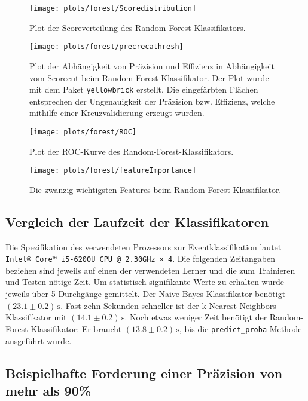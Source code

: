 \begin{figure}
	\centering
	\texttt{[image: plots/forest/Scoredistribution]}
	\caption{Plot der Scoreverteilung des Random-Forest-Klassifikators.}
	\label{fig:RF_SD}
\end{figure}

\begin{figure}
	\centering
	\texttt{[image: plots/forest/precrecathresh]}
	\caption{Plot der Abhängigkeit von Präzision und Effizienz in Abhängigkeit vom Scorecut beim Random-Forest-Klassifikator. Der Plot wurde mit dem Paket \texttt{yellowbrick} \cite{yellowbrick} erstellt. Die eingefärbten Flächen entsprechen der Ungenauigkeit der Präzision bzw. Effizienz, welche mithilfe einer Kreuzvalidierung erzeugt wurden.}
	\label{fig:RF_PRT}
\end{figure}

\begin{figure}
	\centering
	\texttt{[image: plots/forest/ROC]}
	\caption{Plot der ROC-Kurve des Random-Forest-Klassifikators.}
	\label{fig:RF_ROC}
\end{figure}


\begin{figure}
	\centering
	\texttt{[image: plots/forest/featureImportance]}
	\caption{Die zwanzig wichtigsten Features beim Random-Forest-Klassifikator.}
	\label{fig:RF_FI}
\end{figure}


\subsection{Vergleich der Laufzeit der Klassifikatoren}

Die Spezifikation des verwendeten Prozessors zur Eventklassifikation lautet \texttt{Intel® Core™ i5-6200U CPU @ 2.30GHz × 4}. Die folgenden Zeitangaben beziehen sind jeweils auf einen der verwendeten Lerner und die zum Trainieren und Testen nötige Zeit. Um statistisch signifikante Werte zu erhalten wurde jeweils über 5 Durchgänge gemittelt. Der Naive-Bayes-Klassifikator benötigt $(23.1 \pm 0.2) \,\text{s}$. Fast zehn Sekunden schneller ist der k-Nearest-Neighbors-Klassifikator mit $(14.1 \pm 0.2) \,\text{s}$. Noch etwas weniger Zeit benötigt der Random-Forest-Klassifikator: Er braucht $(13.8 \pm 0.2) \,\text{s}$, bis die \texttt{predict\_proba} Methode ausgeführt wurde.\textsl{}

\subsection{Beispielhafte Forderung einer Präzision von mehr als 90\%}

